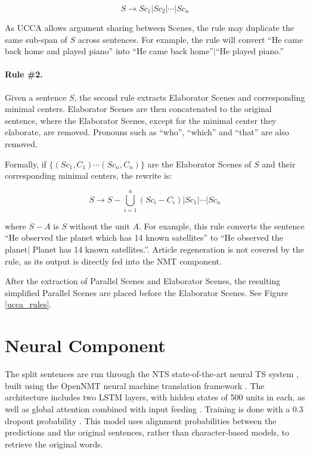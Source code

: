 \documentclass[11pt,a4paper]{article}
\begin{document}
{\small $$ S \longrightarrow Sc_{1}|Sc_{2}| \cdots |Sc_{n}$$}

\vspace{-0.6cm}
As UCCA allows argument sharing between Scenes, the rule may duplicate the same sub-span of $S$ 
across sentences.
For example, the rule will convert ``He came back home and played piano'' 
into ``He came back home''$|$``He played piano.'' 

\paragraph{Rule \#2.}
Given a sentence $S$, the second rule extracts Elaborator Scenes and corresponding minimal centers. 
Elaborator Scenes are then concatenated to the original sentence, where the Elaborator Scenes, 
except for the minimal center they elaborate, are removed. 
Pronouns such as ``who'', ``which'' and ``that'' are also removed. 

Formally, if $\{(Sc_1,C_1) \cdots (Sc_n,C_n)\}$ are the Elaborator Scenes of $S$ 
and their corresponding minimal centers, the rewrite is:
\vspace{-0.3cm}

{\small $$ S \longrightarrow S - \bigcup_{i=1}^{n} (Sc_{i} - C_{i}) | Sc_{1}| \cdots|Sc_{n}$$}
\vspace{-0.4cm}

\noindent
where $S-A$ is $S$ without the unit $A$.
For example, this rule converts the sentence ``He observed the planet which has 14 known satellites'' 
to  ``He observed the planet$|$ Planet has 14 known satellites.''.
Article regeneration is not covered by the rule, as its output is directly fed into the NMT component.

After the extraction of Parallel Scenes and Elaborator Scenes, the resulting simplified Parallel Scenes are placed before the Elaborator Scenes. 
See Figure \ref{ucca_rules}.

\vspace{-0.2cm}
\section{Neural Component}\label{sec:neural-based}
\vspace{-0.1cm}

The split sentences are run through the NTS state-of-the-art neural TS system \citep{Ni17}, 
built using the OpenNMT neural machine translation framework \citep{K17}. 
The architecture includes two LSTM layers, with hidden states of 500 units in each,
as well as global attention combined with input feeding \citep{L15}. Training is done with a 0.3 dropout probability \citep{Sr14}.
This model uses alignment probabilities between the predictions and the original sentences, rather than character-based models, to retrieve the original words.
\end{document}
